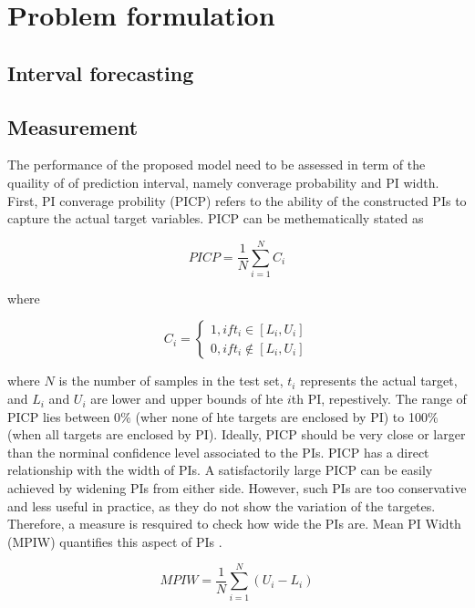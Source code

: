 \documentclass[review]{elsarticle}
\begin{document}
\section{Problem formulation}

  \subsection{Interval forecasting}

  \subsection{Measurement}
    The performance of the proposed model need to be assessed in term of the quaility of of prediction interval, namely converage probability and PI width. First,  PI converage probility (PICP) refers to the ability of the constructed PIs to capture the actual target variables. PICP can be methematically stated as

    \begin{equation}
      PICP = \frac{1}{N} \sum_{i=1}^{N} C_{i}
      \label{eq.PICP}
    \end{equation}

    where

    \begin{equation}
      C_{i} =
      \begin{cases}
        1, if t_{i} \in [L_{i},U_{i}] \\
        0, if t_{i} \not\in [L_{i},U_{i}]
      \end{cases}
      \label{eq.Ci}
    \end{equation}

    where $N$ is the number of samples in the test set, $t_{i}$ represents the actual target, and $L_{i}$ and $U_{i}$ are lower and upper bounds of hte $i$th PI, repestively. The range of PICP lies between 0$\%$ (wher none of hte targets are enclosed by PI) to 100$\%$ (when all targets are enclosed by PI). Ideally, PICP should be very close or larger than the norminal confidence level associated to the PIs.
    PICP has a direct relationship with the width of PIs. A satisfactorily large PICP can be easily achieved by widening PIs from either side. However, such PIs are too conservative and less useful in practice, as they do not show the variation of the targetes. Therefore, a measure is resquired to check how wide the PIs are. Mean PI Width (MPIW) quantifies this aspect of PIs \cite{Khosravi2010}.

    \begin{equation}
      MPIW = \frac{1}{N} \sum_{i=1}^{N} (U_{i}-L_{i})
      \label{eq.MPIW}
    \end{equation}
\end{document}
